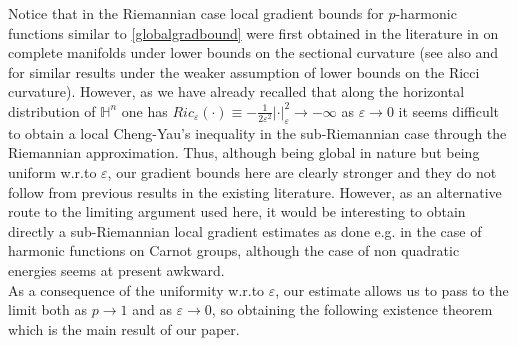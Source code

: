 \documentclass[10pt]{amsart}
\numberwithin{equation}{section}
\theoremstyle{definition}
\newcommand{\He}{\mathbb{H}}
\begin{document}
Notice that in the Riemannian case local gradient bounds for $p$-harmonic functions  similar to \eqref{globalgradbound} were first obtained in the literature in \cite{KotschwarNi} on complete manifolds under lower bounds on the sectional curvature (see also \cite{WangZhang} and  \cite{Rigoli} for similar results under the weaker assumption of lower bounds on the Ricci curvature). However, as we have already recalled that along the horizontal distribution of $\He^n$ one has  $Ric_\varepsilon (\cdot)\equiv -\frac{1}{2 \varepsilon^2}|\cdot|_\varepsilon^2 \to -\infty $ as $\varepsilon \to 0$ it seems difficult to obtain a local Cheng-Yau's inequality in the sub-Riemannian case through the Riemannian approximation. Thus, although being global in nature but being uniform w.r.to $\varepsilon$, our gradient bounds here are clearly stronger and they do not follow from previous results in the existing literature. However, as an alternative route to the limiting argument used here, it would be interesting to obtain directly a sub-Riemannian local gradient estimates as done e.g. \cite{Baudoin} in the case of harmonic functions on Carnot groups, although the case of non quadratic energies seems at present awkward.\\

As a consequence of the uniformity w.r.to $\varepsilon$, our estimate allows us to pass to the limit both as $p \to 1$ and as $\varepsilon \to 0$, so obtaining the following existence theorem 
which is the main result of our paper.
\end{document}
